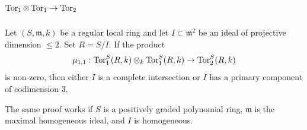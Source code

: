 \documentclass[11pt]{amsart}
\def\gm{{\mathfrak m}}
\begin{document}


\section{\texorpdfstring{$\operatorname{Tor}_{1}\otimes \operatorname{Tor}_{1} \to \operatorname{Tor}_{2}$}{Tor1 tensor Tor1 to Tor2}}\label{sec:first-mult}

\begin{theorem}\label{thm:first-mult} Let $(S,\gm,k)$ be a regular local ring and let $I\subset \gm^{2}$ be an ideal of projective dimension $\leq 2$. Set $R= S/I$.
 If the product
 $$
\mu_{1,1}: \operatorname{Tor}_{1}^{S}(R,k) \otimes_{k} \operatorname{Tor}_{1}^{S}(R,k)  \to \operatorname{Tor}_{2}^{S}(R,k) 
$$ 
is non-zero, then either $I$ is a complete intersection or $I$ has a primary component of codimension 3.
\end{theorem}

The same proof works if $S$ is a positively graded polynomial ring, $\gm$ is the maximal
homogeneous ideal, and $I$ is homogeneous.
\end{document}

